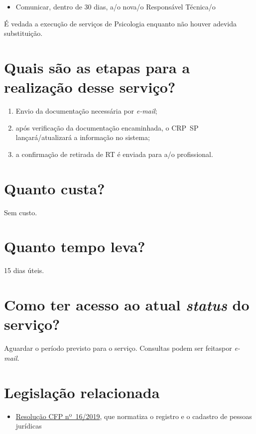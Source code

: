 \begin{itemize}
  \item  Comunicar, dentro de 30 dias, a/o nova/o Responsável Técnica/o
\end{itemize}

É vedada a execução de serviços de Psicologia enquanto não houver adevida substituição.

\section{Quais são as etapas para a realização desse serviço?}

\begin{enumerate}
  \item  Envio da documentação necessária por \emph{e-mail};
  \item  após verificação da documentação encaminhada, o CRP~SP  lançará/atualizará a informação no sistema;
  \item  a confirmação de retirada de RT é enviada para a/o  profissional.
\end{enumerate}

\section{Quanto custa?}

Sem custo.

\section{Quanto tempo leva?}

15 dias úteis.

\section{Como ter acesso ao atual \emph{status} do serviço?}

Aguardar o período previsto para o serviço. Consultas podem ser feitaspor \emph{e-mail.}

\section{Legislação relacionada}

\begin{itemize}
  \item  \href{https://atosoficiais.com.br/cfp/resolucao-administrativa-financeira-n-16-2019-altera-o-manual-de-procedimentos-administrativo-e-financeiro-do-sistema-conselhos-de-psicologia-anexo-da-resolucao-cfp-n-202018-a-resolucao-cfp-n-03-2007-a-resolucao-cfp-n-16-2019-e-da-outras-providencias}{Resolução  CFP nº~16/2019}, que normatiza o registro e o cadastro de pessoas  jurídicas
\end{itemize}

